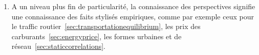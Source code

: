 {\begin{enumerate}
\item A un niveau plus fin de particularité, la connaissance des perspectives signifie une connaissance des faits stylisés empiriques, comme par exemple ceux pour le traffic routier~\ref{sec:transportationequilibrium}, les prix des carburants~\ref{sec:energyprice}, les formes urbaines et de réseau~\ref{sec:staticcorrelations}.
\end{enumerate}
}





\stars








